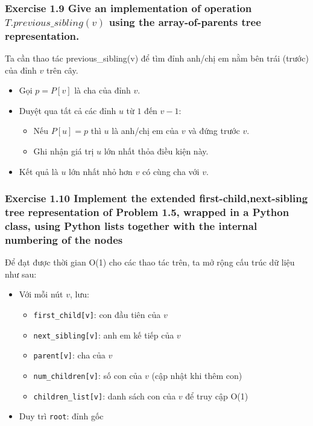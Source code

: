 \documentclass{article}
\begin{document}
	\subsubsection*{Exercise 1.9 Give an implementation of operation $T.previous\_sibling(v)$ using the array-of-parents tree representation.}
	
	Ta cần thao tác previous\_sibling(v) để tìm đỉnh anh/chị em nằm bên trái (trước) của đỉnh $v$ trên cây.
	
	\begin{itemize}
		\item Gọi $p = P[v]$ là cha của đỉnh $v$.
		\item Duyệt qua tất cả các đỉnh $u$ từ $1$ đến $v-1$:
		\begin{itemize}
			\item Nếu $P[u] = p$ thì $u$ là anh/chị em của $v$ và đứng trước $v$.
			\item Ghi nhận giá trị $u$ lớn nhất thỏa điều kiện này.
		\end{itemize}
		\item Kết quả là $u$ lớn nhất nhỏ hơn $v$ có cùng cha với $v$.
	\end{itemize}
	
	\subsubsection*{ Exercise 1.10 Implement the extended first-child,next-sibling tree representation of Problem 1.5, wrapped in a Python class, using Python lists together with the internal numbering of the nodes}
	
	Để đạt được thời gian O(1) cho các thao tác trên, ta mở rộng cấu trúc dữ liệu như sau:
	
	\begin{itemize}
		\item Với mỗi nút \(v\), lưu:
		\begin{itemize}
			\item \texttt{first\_child[v]}: con đầu tiên của \(v\)
			\item \texttt{next\_sibling[v]}: anh em kế tiếp của \(v\)
			\item \texttt{parent[v]}: cha của \(v\)
			\item \texttt{num\_children[v]}: số con của \(v\) (cập nhật khi thêm con)
			\item \texttt{children\_list[v]}: danh sách con của \(v\) để truy cập O(1)
		\end{itemize}
		\item Duy trì \texttt{root}: đỉnh gốc
	\end{itemize}
\end{document}
